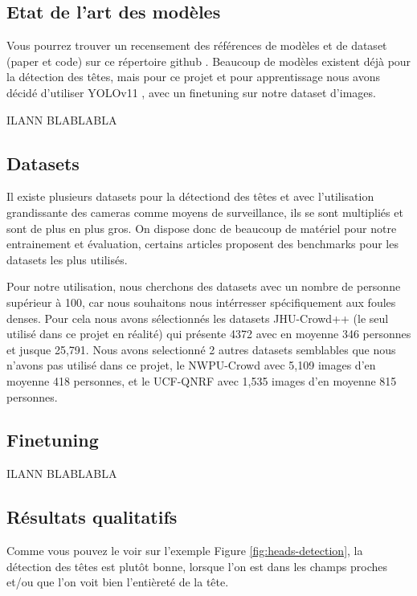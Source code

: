 
\subsection{Etat de l'art des modèles}

Vous pourrez trouver un recensement des références de modèles et de dataset (paper et code) sur ce répertoire github \cite{state_of_the_art_crowd_counting}. Beaucoup de modèles existent déjà pour la détection des têtes, mais pour ce projet et pour apprentissage nous avons décidé d'utiliser YOLOv11 \cite{khanam2024yolov11overviewkeyarchitectural}, avec un finetuning sur notre dataset d'images.

ILANN BLABLABLA

\subsection{Datasets}

Il existe plusieurs datasets pour la détectiond des têtes et avec l'utilisation grandissante des cameras comme moyens de surveillance, ils se sont multipliés et sont de plus en plus gros. On dispose donc de beaucoup de matériel pour notre entrainement et évaluation, certains articles \cite{state_of_the_art_datasets} proposent des benchmarks pour les datasets les plus utilisés.

Pour notre utilisation, nous cherchons des datasets avec un nombre de personne supérieur à 100, car nous souhaitons nous intérresser spécifiquement aux foules denses. Pour cela nous avons sélectionnés les datasets JHU-Crowd++ \cite{sindagi2020jhu-crowd++} (le seul utilisé dans ce projet en réalité) qui présente 4372 avec en moyenne 346 personnes et jusque 25,791.
Nous avons selectionné 2 autres datasets semblables que nous n'avons pas utilisé dans ce projet, le NWPU-Crowd \cite{gao2020nwpu} avec 5,109 images d'en moyenne 418 personnes, et le UCF-QNRF \cite{idress2018ucfqnrf} avec 1,535 images d'en moyenne 815 personnes.

\subsection{Finetuning}

ILANN BLABLABLA

\subsection{Résultats qualitatifs}

Comme vous pouvez le voir sur l'exemple Figure \ref{fig:heads-detection}, la détection des têtes est plutôt bonne, lorsque l'on est dans les champs proches et/ou que l'on voit bien l'entièreté de la tête.

